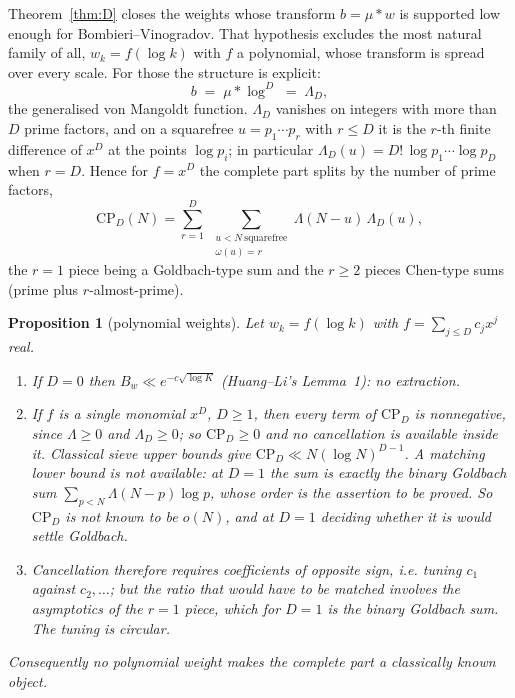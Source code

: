 \documentclass[11pt,a4paper]{article}
\theoremstyle{plain}
\newtheorem{proposition}[theorem]{Proposition}
\theoremstyle{definition}
\theoremstyle{remark}
\begin{document}
Theorem~\ref{thm:D} closes the weights whose transform $b=\mu*w$ is
supported low enough for Bombieri--Vinogradov. That hypothesis
excludes the most natural family of all, $w_k=f(\log k)$ with $f$ a
polynomial, whose transform is spread over every scale. For those the
structure is explicit:
\[
  b\;=\;\mu*\log^D\;=\;\Lambda_D,
\]
the generalised von Mangoldt function. $\Lambda_D$ vanishes on
integers with more than $D$ prime factors, and on a squarefree
$u=p_1\cdots p_r$ with $r\le D$ it is the $r$-th finite difference of
$x^D$ at the points $\log p_i$; in particular
$\Lambda_D(u)=D!\,\log p_1\cdots\log p_D$ when $r=D$. Hence for
$f=x^D$ the complete part splits by the number of prime factors,
\begin{equation}\label{eq:CPD}
  \mathrm{CP}_D(N)=\sum_{r=1}^{D}\
    \sum_{\substack{u<N\ \text{squarefree}\\ \omega(u)=r}}
   \Lambda(N-u)\,\Lambda_D(u),
\end{equation}
the $r=1$ piece being a Goldbach-type sum and the $r\ge2$ pieces
Chen-type sums (prime plus $r$-almost-prime).

\begin{proposition}[polynomial weights]\label{prop:Dpp}
Let $w_k=f(\log k)$ with $f=\sum_{j\le D}c_jx^j$ real.
\begin{enumerate}
\item[(i)] If $D=0$ then $B_w\ll e^{-c\sqrt{\log K}}$ (Huang--Li's
Lemma~1): no extraction.
\item[(ii)] If $f$ is a single monomial $x^D$, $D\ge1$, then every
term of $\mathrm{CP}_D$ is nonnegative, since $\Lambda\ge0$ and
$\Lambda_D\ge0$; so $\mathrm{CP}_D\ge0$ and \emph{no cancellation is
available inside it}. Classical sieve upper bounds give
$\mathrm{CP}_D\ll N(\log N)^{D-1}$. A matching lower bound is not
available: at $D=1$ the sum is exactly the binary Goldbach sum
$\sum_{p<N}\Lambda(N-p)\log p$, whose order is the assertion to be
proved. So $\mathrm{CP}_D$ is not known to be $o(N)$, and at $D=1$
deciding whether it is would settle Goldbach.
\item[(iii)] Cancellation therefore requires coefficients of opposite
sign, i.e. tuning $c_1$ against $c_2,\dots$; but the ratio that would
have to be matched involves the asymptotics of the $r=1$ piece, which
for $D=1$ \emph{is} the binary Goldbach sum. The tuning is circular.
\end{enumerate}
Consequently no polynomial weight makes the complete part a
classically known object.
\end{proposition}
\end{document}
